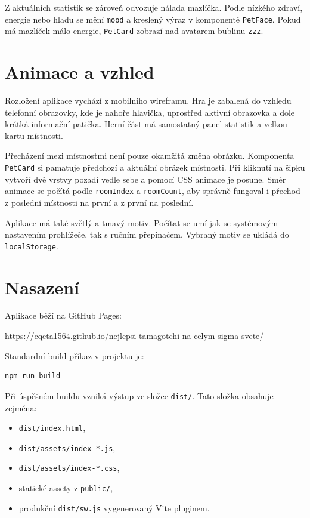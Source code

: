 \documentclass[12pt,a4paper]{article}
\begin{document}
Z aktuálních statistik se zároveň odvozuje nálada mazlíčka. Podle nízkého zdraví, energie nebo hladu se mění \texttt{mood} a kreslený výraz v komponentě \texttt{PetFace}. Pokud má mazlíček málo energie, \texttt{PetCard} zobrazí nad avatarem bublinu \texttt{zzz}.

\section{Animace a vzhled}

Rozložení aplikace vychází z mobilního wireframu. Hra je zabalená do vzhledu telefonní obrazovky, kde je nahoře hlavička, uprostřed aktivní obrazovka a dole krátká informační patička. Herní část má samostatný panel statistik a velkou kartu místnosti.

Přecházení mezi místnostmi není pouze okamžitá změna obrázku. Komponenta \texttt{PetCard} si pamatuje předchozí a aktuální obrázek místnosti. Při kliknutí na šipku vytvoří dvě vrstvy pozadí vedle sebe a pomocí CSS animace je posune. Směr animace se počítá podle \texttt{roomIndex} a \texttt{roomCount}, aby správně fungoval i přechod z poslední místnosti na první a z první na poslední.

Aplikace má také světlý a tmavý motiv. Počítat se umí jak se systémovým nastavením prohlížeče, tak s ručním přepínačem. Vybraný motiv se ukládá do \texttt{localStorage}.

\section{Nasazení}

Aplikace běží na GitHub Pages:

\url{https://cqeta1564.github.io/nejlepsi-tamagotchi-na-celym-sigma-svete/}

Standardní build příkaz v projektu je:
\begin{verbatim}
npm run build
\end{verbatim}

Při úspěšném buildu vzniká výstup ve složce \texttt{dist/}. Tato složka obsahuje zejména:
\begin{itemize}[leftmargin=2em]
  \item \texttt{dist/index.html},
  \item \texttt{dist/assets/index-*.js},
  \item \texttt{dist/assets/index-*.css},
  \item statické assety z \texttt{public/},
  \item produkční \texttt{dist/sw.js} vygenerovaný Vite pluginem.
\end{itemize}
\end{document}
